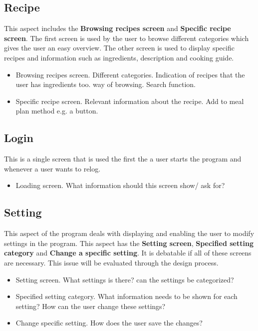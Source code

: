 \subsection{Recipe}
This aspect includes the \textbf{Browsing recipes screen} and \textbf{Specific recipe screen}. The first screen is used by the user to browse different categories which gives the user an easy overview. The other screen is used to display specific recipes and information such as ingredients, description and cooking guide.

\begin{itemize}
	\item Browsing recipes screen.
		\subitem Different categories. 
		\subitem Indication of recipes that the user has ingredients too.
		\subitem way of browsing.
		\subitem Search function.
	\item Specific recipe screen.
		\subitem Relevant information about the recipe.
		\subitem Add to meal plan method e.g. a button.
\end{itemize}

\subsection{Login}
This is a single screen that is used the first the a user starts the program and whenever a user wants to relog.

\begin{itemize}
	\item Loading screen.
		\subitem What information should this screen show/ ask for?
\end{itemize}

\subsection{Setting}
This aspect of the program deals with displaying and enabling the user to modify settings in the program. This aspect has the \textbf{Setting screen}, \textbf{Specified setting category} and \textbf{Change a specific setting}. It is debatable if all of these screens are necessary. This issue will be evaluated through the design process.

\begin{itemize}
	\item Setting screen. 
		\subitem What settings is there?
		\subitem can the settings be categorized?
	\item Specified setting category.
		\subitem What information needs to be shown for each setting?
		\subitem How can the user change these settings?
	\item Change specific setting.
		\subitem How does the user save the changes?
\end{itemize}  

